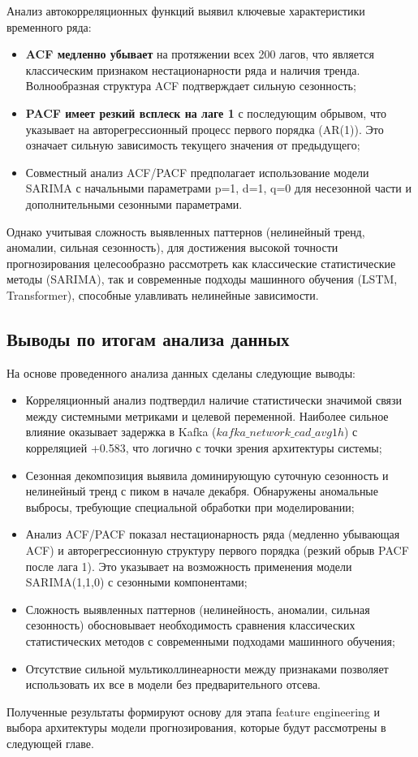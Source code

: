 Анализ автокорреляционных функций выявил ключевые характеристики временного ряда:

\begin{itemize}
	\item \textbf{ACF медленно убывает} на протяжении всех 200 лагов, что является классическим признаком нестационарности ряда и наличия тренда. Волнообразная структура ACF подтверждает сильную сезонность;
	\item \textbf{PACF имеет резкий всплеск на лаге 1} с последующим обрывом, что указывает на авторегрессионный процесс первого порядка (AR(1)). Это означает сильную зависимость текущего значения от предыдущего;
	\item Совместный анализ ACF/PACF предполагает использование модели SARIMA с начальными параметрами p=1, d=1, q=0 для несезонной части и дополнительными сезонными параметрами.
\end{itemize}

Однако учитывая сложность выявленных паттернов (нелинейный тренд, аномалии, сильная сезонность), для достижения высокой точности прогнозирования целесообразно рассмотреть как классические статистические методы (SARIMA), так и современные подходы машинного обучения (LSTM, Transformer), способные улавливать нелинейные зависимости.

\subsection{Выводы по итогам анализа данных}

На основе проведенного анализа данных сделаны следующие выводы:

\begin{itemize}
	\item Корреляционный анализ подтвердил наличие статистически значимой связи между системными метриками и целевой переменной. Наиболее сильное влияние оказывает задержка в Kafka ($kafka\_network\_cad\_avg1h$) с корреляцией +0.583, что логично с точки зрения архитектуры системы;
	\item Сезонная декомпозиция выявила доминирующую суточную сезонность и нелинейный тренд с пиком в начале декабря. Обнаружены аномальные выбросы, требующие специальной обработки при моделировании;
	\item Анализ ACF/PACF показал нестационарность ряда (медленно убывающая ACF) и авторегрессионную структуру первого порядка (резкий обрыв PACF после лага 1). Это указывает на возможность применения модели SARIMA(1,1,0) с сезонными компонентами;
	\item Сложность выявленных паттернов (нелинейность, аномалии, сильная сезонность) обосновывает необходимость сравнения классических статистических методов с современными подходами машинного обучения;
	\item Отсутствие сильной мультиколлинеарности между признаками позволяет использовать их все в модели без предварительного отсева.
\end{itemize}

Полученные результаты формируют основу для этапа feature engineering и выбора архитектуры модели прогнозирования, которые будут рассмотрены в следующей главе.

